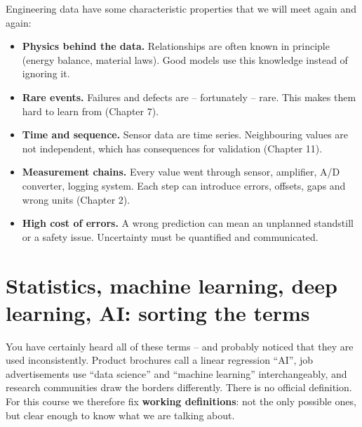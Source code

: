 \documentclass[
  letterpaper,
  DIV=11,
  numbers=noendperiod]{scrreprt}
\providecommand{\tightlist}{%
  \setlength{\itemsep}{0pt}\setlength{\parskip}{0pt}}\usepackage{longtable,booktabs,array}
\begin{document}
Engineering data have some characteristic properties that we will meet
again and again:

\begin{itemize}
\tightlist
\item
  \textbf{Physics behind the data.} Relationships are often known in
  principle (energy balance, material laws). Good models use this
  knowledge instead of ignoring it.
\item
  \textbf{Rare events.} Failures and defects are -- fortunately -- rare.
  This makes them hard to learn from (Chapter 7).
\item
  \textbf{Time and sequence.} Sensor data are time series. Neighbouring
  values are not independent, which has consequences for validation
  (Chapter 11).
\item
  \textbf{Measurement chains.} Every value went through sensor,
  amplifier, A/D converter, logging system. Each step can introduce
  errors, offsets, gaps and wrong units (Chapter 2).
\item
  \textbf{High cost of errors.} A wrong prediction can mean an unplanned
  standstill or a safety issue. Uncertainty must be quantified and
  communicated.
\end{itemize}

\section{Statistics, machine learning, deep learning, AI: sorting the
terms}\label{statistics-machine-learning-deep-learning-ai-sorting-the-terms}

You have certainly heard all of these terms -- and probably noticed that
they are used inconsistently. Product brochures call a linear regression
``AI'', job advertisements use ``data science'' and ``machine learning''
interchangeably, and research communities draw the borders differently.
There is no official definition. For this course we therefore fix
\textbf{working definitions}: not the only possible ones, but clear
enough to know what we are talking about.
\end{document}

